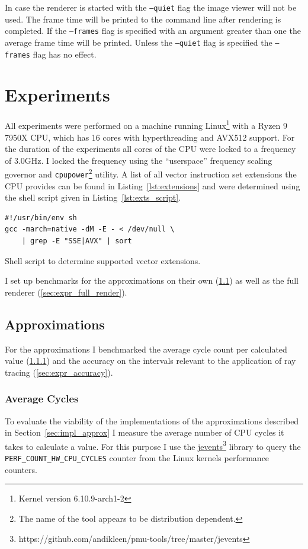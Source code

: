 \documentclass[a4paper, 11pt]{memoir}
\begin{document}
    In case the renderer is started with the \texttt{--quiet} flag the image viewer will not be used. The frame
    time will be printed to the command line after rendering is completed. If the \texttt{--frames} flag is
    specified with an argument greater than one the average frame time will be printed. Unless the \texttt{--quiet}
    flag is specified the \texttt{--frames} flag has no effect.

    \chapter{Experiments}
    \label{ch:experiments}
    
    All experiments were performed on a machine running Linux\footnote{Kernel version 6.10.9-arch1-2} with a Ryzen 9
    7950X CPU, which has 16 cores with hyperthreading and AVX512 support. For the duration of the experiments all cores
    of the CPU were locked to a frequency of $3.0$GHz. I locked the frequency using the \enquote{userspace} frequency
    scaling governor and \texttt{cpupower}\footnote{The name of the tool appears to be distribution dependent.}
    utility. A list of all vector instruction set extensions the CPU provides can be found in Listing~\ref{lst:extensions}
    and were determined using the shell script given in Listing~\ref{lst:exts_script}.
    \begin{listing}[t]
        \begin{verbatim}
#!/usr/bin/env sh
gcc -march=native -dM -E - < /dev/null \
    | grep -E "SSE|AVX" | sort
        \end{verbatim}
        \caption{Shell script to determine supported vector extensions.}
        \label{lst:exts_script}
    \end{listing}

    I set up benchmarks for the approximations on their own (\ref{sec:expr_approx}) as well as the full renderer
    (\ref{sec:expr_full_render}).

    \section{Approximations}
    \label{sec:expr_approx}
    For the approximations I benchmarked the average cycle count per calculated value (\ref{sec:expr_average_cycles}) and
    the accuracy on the intervals relevant to the application of ray tracing (\ref{sec:expr_accuracy}).

    \subsection{Average Cycles}
    \label{sec:expr_average_cycles}
    To evaluate the viability of the implementations of the approximations described in Section~\ref{sec:impl_approx} I
    measure the average number of CPU cycles it takes to calculate a value. For this purpose I use the
    \href{https://github.com/andikleen/pmu-tools/tree/master/jevents}{jevents}\footnote{https://github.com/andikleen/pmu-tools/tree/master/jevents}
    library to query the \texttt{PERF_COUNT_HW_CPU_CYCLES} counter from the Linux kernels performance counters.
\end{document}
